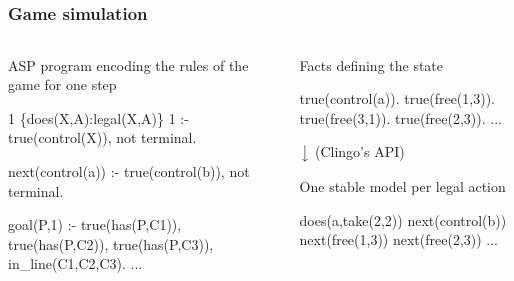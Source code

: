 \documentclass{beamer}
\begin{document}
\subsection{}
  \begin{frame}[fragile]
    \frametitle{Game simulation}
    \footnotesize
    \begin{columns}
      \begin{column}{0.48\textwidth}
        ASP program encoding the rules of the game for one step
          \begin{example}
            \begin{semiverbatim}
              \footnotesize
1 \{does(X,A):legal(X,A)\} 1 :- 
  true(control(X)),
  not terminal.

next(control(a)) :- 
  true(control(b)), 
  not terminal.

goal(P,1) :- 
  true(has(P,C1)),
  true(has(P,C2)),
  true(has(P,C3)),
  in_line(C1,C2,C3).
...
      
            \end{semiverbatim}
        \end{example}
      \end{column}
      \pause
      \begin{column}{0.48\textwidth}
        Facts defining the state
        \begin{example}
          \begin{semiverbatim}
            \footnotesize
true(control(a)).
true(free(1,3)).
true(free(3,1)).
true(free(2,3)).
...
          \end{semiverbatim}
      \end{example}
\pause
      $\big\downarrow$ (Clingo's API)
      \vspace{10px}

      One stable model per legal action
      \begin{example}
        \begin{semiverbatim}
          \footnotesize
does(a,take(2,2))
next(control(b))
next(free(1,3))
next(free(2,3))
...
        \end{semiverbatim}
    \end{example}
      \end{column}
  \end{columns}

\end{frame}
\end{document}
